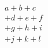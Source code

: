 \documentclass[nofonts]{ctexart}
\begin{document}
\begin{multline}
	a+b+c	\\
	+d+e+f	\\
	+g+h+i	\\
	+j+k+l
\end{multline}
\end{document}
